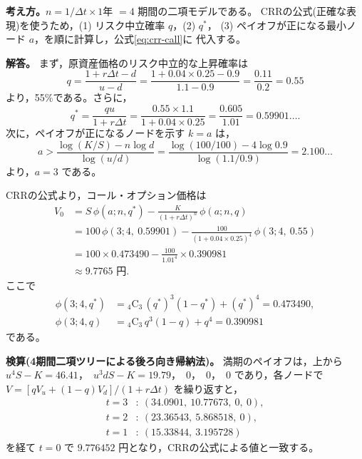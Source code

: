 \begin{answerbox}
\textbf{考え方。}$n = 1/\Delta t \times 1$年 $= 4$ 期間の二項モデルである。
CRRの公式(正確な表現)を使うため，(1) リスク中立確率 $q$，(2) $q^*$，
(3) ペイオフが正になる最小ノード $a$，を順に計算し，公式\eqref{eq:crr-call}に
代入する。

\medskip
\textbf{解答。}
まず，原資産価格のリスク中立的な上昇確率は
\[
q = \frac{1 + r\Delta t - d}{u - d}
= \frac{1 + 0.04\times 0.25 - 0.9}{1.1 - 0.9} = \frac{0.11}{0.2} = 0.55
\]
より，55\%である。さらに，
\[
q^* = \frac{qu}{1+r\Delta t} = \frac{0.55\times 1.1}{1 + 0.04\times 0.25}
= \frac{0.605}{1.01} = 0.59901\ldots.
\]
次に，ペイオフが正になるノードを示す $k=a$ は，
\[
a > \frac{\log(K/S) - n\log d}{\log(u/d)}
= \frac{\log(100/100) - 4\log 0.9}{\log(1.1/0.9)} = 2.100\ldots
\]
より，$a = 3$ である。

CRRの公式より，コール・オプション価格は
\begin{align*}
V_0 &= S\,\phi(a;n,q^*) - \frac{K}{(1+r\Delta t)^n}\,\phi(a;n,q)\\
&= 100\,\phi(3;4,\ 0.59901) - \frac{100}{(1+0.04\times 0.25)^4}\,
\phi(3;4,\ 0.55)\\
&= 100\times 0.473490 - \frac{100}{1.01^4}\times 0.390981\\
&\approx 9.7765 \text{ 円}.
\end{align*}
ここで
\begin{align*}
\phi(3;4,q^*) &= {}_4\mathrm{C}_3\,(q^*)^3(1-q^*) + (q^*)^4 = 0.473490,\\
\phi(3;4,q) &= {}_4\mathrm{C}_3\,q^3(1-q) + q^4 = 0.390981
\end{align*}
である。

\medskip
\textbf{検算(4期間二項ツリーによる後ろ向き帰納法)。}
満期のペイオフは，上から
$u^4S - K = 46.41$，\ $u^3dS - K = 19.79$，\ 0，\ 0，\ 0 であり，各ノードで
$V = [qV_u + (1-q)V_d]/(1+r\Delta t)$ を繰り返すと，
\begin{align*}
t=3&:\ (34.0901,\ 10.77673,\ 0,\ 0),\\
t=2&:\ (23.36543,\ 5.868518,\ 0),\\
t=1&:\ (15.33844,\ 3.195728)
\end{align*}
を経て $t=0$ で $9.776452$ 円となり，CRRの公式による値と一致する。
\end{answerbox}

